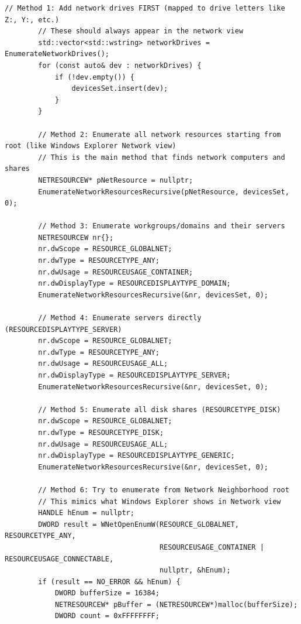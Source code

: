 \begin{lstlisting}[style=CodeListing]
        // Method 1: Add network drives FIRST (mapped to drive letters like Z:, Y:, etc.)
        // These should always appear in the network view
        std::vector<std::wstring> networkDrives = EnumerateNetworkDrives();
        for (const auto& dev : networkDrives) {
            if (!dev.empty()) {
                devicesSet.insert(dev);
            }
        }
        
        // Method 2: Enumerate all network resources starting from root (like Windows Explorer Network view)
        // This is the main method that finds network computers and shares
        NETRESOURCEW* pNetResource = nullptr;
        EnumerateNetworkResourcesRecursive(pNetResource, devicesSet, 0);
        
        // Method 3: Enumerate workgroups/domains and their servers
        NETRESOURCEW nr{};
        nr.dwScope = RESOURCE_GLOBALNET;
        nr.dwType = RESOURCETYPE_ANY;
        nr.dwUsage = RESOURCEUSAGE_CONTAINER;
        nr.dwDisplayType = RESOURCEDISPLAYTYPE_DOMAIN;
        EnumerateNetworkResourcesRecursive(&nr, devicesSet, 0);
        
        // Method 4: Enumerate servers directly (RESOURCEDISPLAYTYPE_SERVER)
        nr.dwScope = RESOURCE_GLOBALNET;
        nr.dwType = RESOURCETYPE_ANY;
        nr.dwUsage = RESOURCEUSAGE_ALL;
        nr.dwDisplayType = RESOURCEDISPLAYTYPE_SERVER;
        EnumerateNetworkResourcesRecursive(&nr, devicesSet, 0);
        
        // Method 5: Enumerate all disk shares (RESOURCETYPE_DISK)
        nr.dwScope = RESOURCE_GLOBALNET;
        nr.dwType = RESOURCETYPE_DISK;
        nr.dwUsage = RESOURCEUSAGE_ALL;
        nr.dwDisplayType = RESOURCEDISPLAYTYPE_GENERIC;
        EnumerateNetworkResourcesRecursive(&nr, devicesSet, 0);
        
        // Method 6: Try to enumerate from Network Neighborhood root
        // This mimics what Windows Explorer shows in Network view
        HANDLE hEnum = nullptr;
        DWORD result = WNetOpenEnumW(RESOURCE_GLOBALNET, RESOURCETYPE_ANY, 
                                     RESOURCEUSAGE_CONTAINER | RESOURCEUSAGE_CONNECTABLE,
                                     nullptr, &hEnum);
        if (result == NO_ERROR && hEnum) {
            DWORD bufferSize = 16384;
            NETRESOURCEW* pBuffer = (NETRESOURCEW*)malloc(bufferSize);
            DWORD count = 0xFFFFFFFF;
            

\end{lstlisting}
